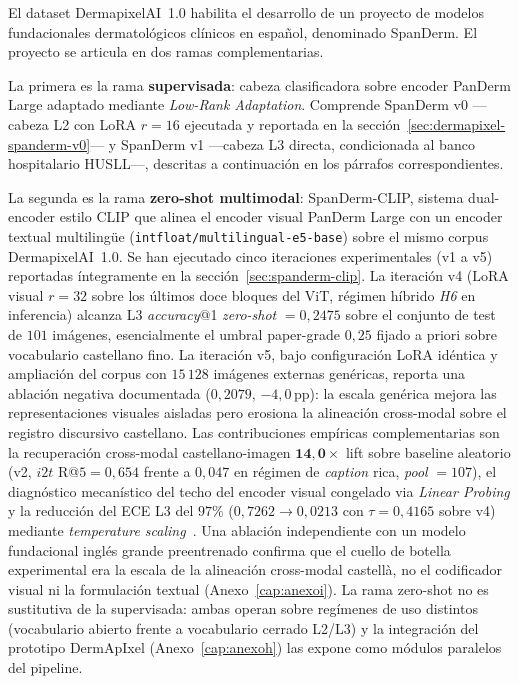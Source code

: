 El dataset DermapixelAI~1.0 habilita el desarrollo de un proyecto
de modelos fundacionales dermatológicos clínicos en español,
denominado SpanDerm. El proyecto se articula en dos ramas
complementarias.

La primera es la rama \textbf{supervisada}: cabeza clasificadora
sobre encoder PanDerm Large adaptado mediante \emph{Low-Rank
Adaptation}. Comprende SpanDerm v0 ---cabeza L2 con LoRA $r=16$
ejecutada y reportada en la
secci\'on~\ref{sec:dermapixel-spanderm-v0}--- y SpanDerm v1
---cabeza L3 directa, condicionada al banco hospitalario HUSLL---,
descritas a continuación en los párrafos correspondientes.

La segunda es la rama \textbf{zero-shot multimodal}:
SpanDerm-CLIP, sistema dual-encoder estilo CLIP que alinea el
encoder visual PanDerm Large con un encoder textual multilingüe
(\texttt{intfloat/multilingual-e5-base}) sobre el mismo corpus
DermapixelAI~1.0. Se han ejecutado cinco iteraciones
experimentales (v1 a v5) reportadas íntegramente en la
secci\'on~\ref{sec:spanderm-clip}. La iteración v4
($\text{LoRA}$ visual $r=32$ sobre los últimos doce bloques del
ViT, régimen híbrido \emph{H6} en inferencia) alcanza L3
\emph{accuracy}@1 \emph{zero-shot} $= 0{,}2475$ sobre el conjunto
de test de $101$ imágenes, esencialmente el umbral paper-grade
$0{,}25$ fijado a priori sobre vocabulario castellano fino. La
iteración v5, bajo configuración LoRA idéntica y ampliación del
corpus con $15\,128$ imágenes externas genéricas, reporta una
ablación negativa documentada ($0{,}2079$, $-4{,}0$\,pp): la
escala genérica mejora las representaciones visuales aisladas
pero erosiona la alineación cross-modal sobre el registro
discursivo castellano. Las contribuciones empíricas
complementarias son la recuperación cross-modal castellano-imagen
$\mathbf{14{,}0\times}$ lift sobre baseline aleatorio (v2,
$i2t$ R@$5 = 0{,}654$ frente a $0{,}047$ en régimen de
\emph{caption} rica, \emph{pool} $= 107$), el
diagnóstico mecanístico del techo del encoder visual congelado
via \emph{Linear Probing} y la reducción del ECE L3 del
$97\%$ ($0{,}7262 \to 0{,}0213$ con $\tau = 0{,}4165$ sobre v4)
mediante \emph{temperature scaling}~\cite{guo2017}. Una ablación
independiente con un modelo fundacional inglés grande preentrenado
confirma que el cuello de botella experimental era la escala de la
alineación cross-modal castellà, no el codificador visual ni la
formulación textual (Anexo~\ref{cap:anexoi}). La rama zero-shot no es sustitutiva de
la supervisada: ambas operan sobre regímenes de uso distintos
(vocabulario abierto frente a vocabulario cerrado L2/L3) y la
integración del prototipo DermApIxel (Anexo~\ref{cap:anexoh})
las expone como módulos paralelos del pipeline.

